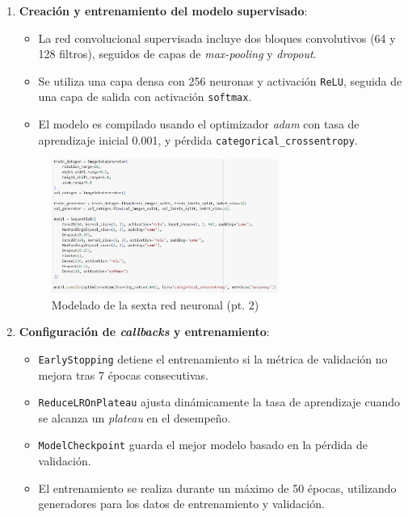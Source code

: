 \begin{enumerate}
	\item \textbf{Creación y entrenamiento del modelo supervisado}:
	\begin{itemize}
		\item La red convolucional supervisada incluye dos bloques convolutivos (64 y 128 filtros), seguidos de capas de \textit{max-pooling} y \textit{dropout}.
		\item Se utiliza una capa densa con 256 neuronas y activación \texttt{ReLU}, seguida de una capa de salida con activación \texttt{softmax}.
		\item El modelo es compilado usando el optimizador \textit{adam} con tasa de aprendizaje inicial 0.001, y pérdida \texttt{categorical\_crossentropy}.
	\end{itemize}
	
	\begin{figure}[H]
		\centering
		\includegraphics[width=0.7\textwidth]{imgs/model-2-red6.JPG}
		\caption{Modelado de la sexta red neuronal (pt. 2)}
		\label{fig:model-2-red6}
	\end{figure}
	
	\item \textbf{Configuración de \textit{callbacks} y entrenamiento}:
	\begin{itemize}
		\item \texttt{EarlyStopping} detiene el entrenamiento si la métrica de validación no mejora tras 7 épocas consecutivas.
		\item \texttt{ReduceLROnPlateau} ajusta dinámicamente la tasa de aprendizaje cuando se alcanza un \textit{plateau} en el desempeño.
		\item \texttt{ModelCheckpoint} guarda el mejor modelo basado en la pérdida de validación.
		\item El entrenamiento se realiza durante un máximo de 50 épocas, utilizando generadores para los datos de entrenamiento y validación.
	\end{itemize}
	

\end{enumerate}
